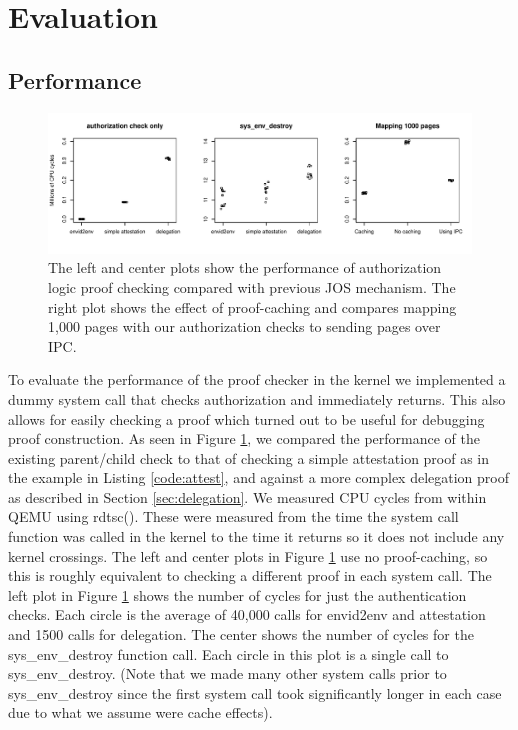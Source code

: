 \documentclass[10pt]{article}
\begin{document}
\section{Evaluation}\label{sec:eval}
\subsection{Performance}
\begin{figure}
\includegraphics[width=\textwidth]{plots.pdf}
\caption{The left and center plots show the performance of authorization logic proof checking compared with previous JOS mechanism.  The right plot shows the effect of proof-caching and compares mapping 1,000 pages with our authorization checks to sending pages over IPC.}
\label{fig:perf}
\end{figure}
To evaluate the performance of the proof checker in the kernel we implemented a dummy system call that checks authorization and immediately returns.  This also allows for easily checking a proof which turned out to be useful for debugging proof construction.  As seen in Figure \ref{fig:perf}, we compared the performance of the existing parent/child check to that of checking a simple attestation proof as in the example in Listing \ref{code:attest}, and against a more complex delegation proof as described in Section \ref{sec:delegation}.  We measured CPU cycles from within QEMU using rdtsc().  These were measured from the time the system call function was called in the kernel to the time it returns so it does not include any kernel crossings.  The left and center plots in Figure \ref{fig:perf} use no proof-caching, so this is roughly equivalent to checking a different proof in each system call.  The left plot in Figure \ref{fig:perf} shows the number of cycles for just the authentication checks.  Each circle is the average of 40,000 calls for \textsf{envid2env} and attestation and 1500 calls for delegation.  The center shows the number of cycles for the \textsf{sys\_env\_destroy} function call.  Each circle in this plot is a single call to \textsf{sys\_env\_destroy}. (Note that we made many other system calls prior to \textsf{sys\_env\_destroy} since the first system call took significantly longer in each case due to what we assume were cache effects).
\end{document}
